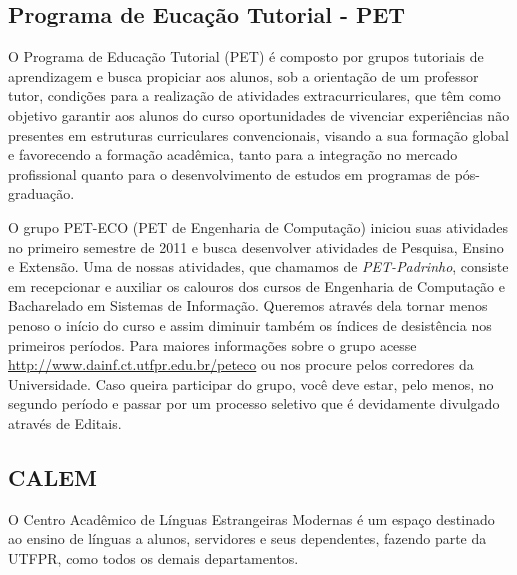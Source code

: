 \documentclass[a4paper,12pt,openany]{article}
\begin{document}




\subsection{Programa de Eucação Tutorial - PET}

O Programa de Educação Tutorial (PET) é composto por grupos tutoriais de aprendizagem e busca propiciar aos alunos, sob a orientação de um professor tutor, condições para a realização de atividades extracurriculares, que têm como objetivo garantir aos alunos do curso oportunidades de vivenciar experiências não presentes em estruturas curriculares convencionais, visando a sua formação global e favorecendo a formação acadêmica, tanto para a integração no mercado profissional quanto para o desenvolvimento de estudos em programas de pós-graduação.

O grupo PET-ECO (PET de Engenharia de Computação) iniciou suas atividades no primeiro semestre de 2011 e busca desenvolver atividades de Pesquisa, Ensino e Extensão. Uma de nossas atividades, que chamamos de \textit{PET-Padrinho}, consiste em recepcionar e auxiliar os calouros dos cursos de Engenharia de Computação e Bacharelado em Sistemas de Informação. Queremos através dela tornar menos penoso o início do curso e assim diminuir também os índices de desistência nos primeiros períodos. Para maiores informações sobre o grupo acesse \href{http://www.dainf.ct.utfpr.edu.br/peteco}{http://www.dainf.ct.utfpr.edu.br/peteco} ou nos procure pelos corredores da Universidade. Caso queira participar do grupo, você deve estar, pelo menos, no segundo período e passar por um processo seletivo que é devidamente divulgado através de Editais.


\subsection{CALEM}

O Centro Acadêmico de Línguas Estrangeiras Modernas é um espaço destinado ao ensino de línguas a alunos, servidores e seus dependentes,  fazendo parte da UTFPR, como todos os demais departamentos.
\end{document}
